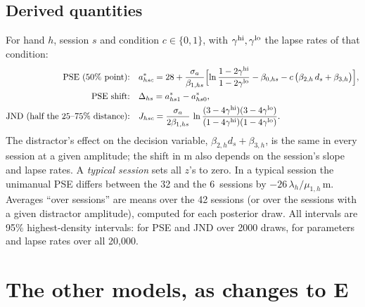 \subsection{Derived quantities}
For hand $h$, session $s$ and condition $c\in\{0,1\}$, with $\gamma^{\mathrm{hi}},\gamma^{\mathrm{lo}}$ the lapse rates of that condition:
\begin{align*}
\text{PSE (50\% point):}\quad & a^{*}_{hsc} = 28 + \frac{\sigma_a}{\beta_{1,hs}}\Bigl[\ln\frac{1-2\gamma^{\mathrm{hi}}}{1-2\gamma^{\mathrm{lo}}} - \beta_{0,hs} - c\,\bigl(\beta_{2,h}\,d_s+\beta_{3,h}\bigr)\Bigr],\\
\text{PSE shift:}\quad & \Delta_{hs} = a^{*}_{hs1}-a^{*}_{hs0},\\
\text{JND (half the 25--75\% distance):}\quad & J_{hsc} = \frac{\sigma_a}{2\beta_{1,hs}}\,\ln\frac{(3-4\gamma^{\mathrm{hi}})(3-4\gamma^{\mathrm{lo}})}{(1-4\gamma^{\mathrm{hi}})(1-4\gamma^{\mathrm{lo}})}.
\end{align*}
The distractor's effect on the decision variable, $\beta_{2,h}d_s+\beta_{3,h}$, is the same in every session at a given amplitude; the shift in \textmu m also depends on the session's slope and lapse rates.
A \emph{typical session} sets all $z$'s to zero.
In a typical session the unimanual PSE differs between the 32 and the 6\um\ sessions by $-26\,\lambda_h/\mu_{1,h}$\,\textmu m.
Averages ``over sessions'' are means over the 42 sessions (or over the sessions with a given distractor amplitude), computed for each posterior draw. All intervals are 95\% highest-density intervals: for PSE and JND over 2000 draws, for parameters and lapse rates over all 20,000.

\begin{table}[h]
\centering\small\renewcommand{\arraystretch}{1.18}
\caption{Model E's hand-level parameters: posterior mean and 95\% highest-density interval (20,000 draws). Logit scale unless noted; $d_s$ is in units of $\sigma_a$.}\label{tab:params}

\end{table}

\section{The other models, as changes to E}\label{sec:others}
